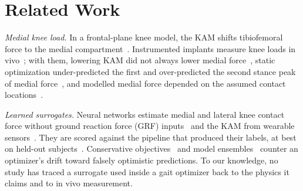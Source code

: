 \section{Related Work}\label{sec:related}

\textit{Medial knee load.} In a frontal-plane knee model, the KAM shifts tibiofemoral force to
the medial compartment~\cite{schipplein1991}. Instrumented implants measure knee loads in
vivo~\cite{kutzner2010,fregly2012}; with them, lowering KAM did not always lower medial
force~\cite{walter2010}, static optimization under-predicted the first and over-predicted the
second stance peak of medial force~\cite{kaneda2023}, and modelled medial force depended on the
assumed contact locations~\cite{lerner2015}.

\textit{Learned surrogates.} Neural networks estimate medial and lateral knee contact force
without ground reaction force (GRF) inputs~\cite{giarmatzis2020} and the KAM from wearable
sensors~\cite{wang2020kam}. They are scored against the pipeline that produced their labels,
at best on held-out subjects~\cite{halilaj2018}. Conservative objectives~\cite{trabucco2021} and model ensembles~\cite{kurutach2018}
counter an optimizer's drift toward falsely optimistic predictions. To our knowledge, no study has traced a surrogate
used inside a gait optimizer back to the physics it claims and to in vivo measurement.
